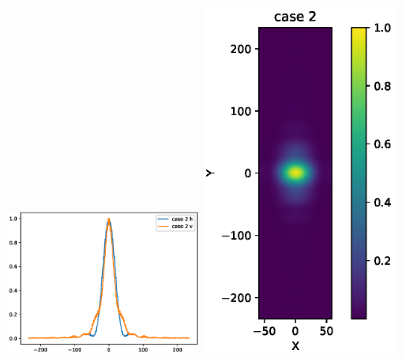 \documentclass{iucr}              %
\begin{document}
\begin{figure}
    \includegraphics[width=0.45\textwidth]{figures/case_2_profiles.eps}
    \includegraphics[width=0.45\textwidth]{figures/case_2_image.eps}


\end{figure}
\end{document}
